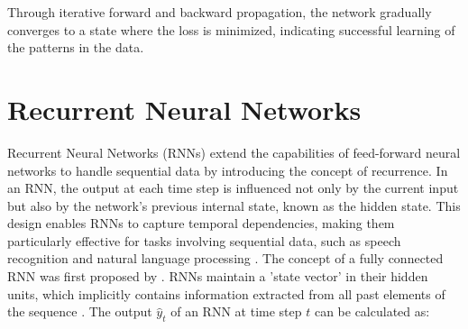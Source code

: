 \documentclass[12pt, a4paper, headinclude, twoside, plainheadsepline, open=right, numbers=noenddot, hidelinks, toc=listof, toc=bibliography]{scrreprt}
\begin{document}
Through iterative forward and backward propagation, the network gradually converges to a state where the loss is minimized, indicating successful learning of the patterns in the data.

\section{Recurrent Neural Networks}
\label{sec:rnn}

Recurrent Neural Networks (RNNs) extend the capabilities of feed-forward neural networks to handle sequential data by introducing the concept of recurrence. In an RNN, the output at each time step is influenced not only by the current input but also by the network's previous internal state, known as the hidden state. This design enables RNNs to capture temporal dependencies, making them particularly effective for tasks involving sequential data, such as speech recognition and natural language processing \cite{lecunDeepLearning2015}.
%
%
%
%
%
%
The concept of a fully connected RNN was first proposed by \citeauthor{elmanFindingStructureTime1990} \cite{elmanFindingStructureTime1990}. 
RNNs maintain a 'state vector' in their hidden units, which implicitly contains information extracted from all past elements of the sequence \cite{lecunDeepLearning2015}. The output \( \hat{y}_t \) of an RNN at time step \( t \) can be calculated as:
\end{document}
